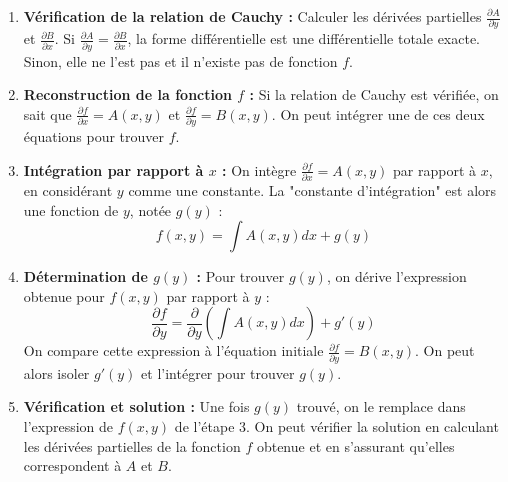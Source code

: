 \documentclass[french]{yLectureNote}
\begin{document}
\begin{enumerate}
    \item \textbf{Vérification de la relation de Cauchy :}
    Calculer les dérivées partielles $\frac{\partial A}{\partial y}$ et $\frac{\partial B}{\partial x}$.
    Si $\frac{\partial A}{\partial y} = \frac{\partial B}{\partial x}$, la forme différentielle est une différentielle totale exacte. Sinon, elle ne l'est pas et il n'existe pas de fonction $f$.

    \item \textbf{Reconstruction de la fonction $f$ :}
    Si la relation de Cauchy est vérifiée, on sait que $\frac{\partial f}{\partial x} = A(x,y)$ et $\frac{\partial f}{\partial y} = B(x,y)$. On peut intégrer une de ces deux équations pour trouver $f$.

    \item \textbf{Intégration par rapport à $x$ :}
    On intègre $\frac{\partial f}{\partial x} = A(x,y)$ par rapport à $x$, en considérant $y$ comme une constante. La "constante d'intégration" est alors une fonction de $y$, notée $g(y)$ :
    \[ f(x,y) = \int A(x,y)dx + g(y) \]

    \item \textbf{Détermination de $g(y)$ :}
    Pour trouver $g(y)$, on dérive l'expression obtenue pour $f(x,y)$ par rapport à $y$ :
    \[ \frac{\partial f}{\partial y} = \frac{\partial}{\partial y} \left( \int A(x,y)dx \right) + g'(y) \]
    On compare cette expression à l'équation initiale $\frac{\partial f}{\partial y} = B(x,y)$. On peut alors isoler $g'(y)$ et l'intégrer pour trouver $g(y)$.

    \item \textbf{Vérification et solution :}
    Une fois $g(y)$ trouvé, on le remplace dans l'expression de $f(x,y)$ de l'étape 3. On peut vérifier la solution en calculant les dérivées partielles de la fonction $f$ obtenue et en s'assurant qu'elles correspondent à $A$ et $B$.
\end{enumerate}
\end{document}
